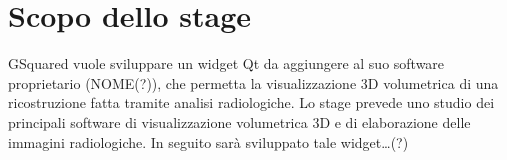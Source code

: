 \section*{Scopo dello stage}
GSquared vuole sviluppare un widget Qt da aggiungere al suo software proprietario (NOME(?)), che permetta la visualizzazione 3D volumetrica di una ricostruzione fatta tramite analisi radiologiche. Lo stage prevede uno studio dei principali software di visualizzazione volumetrica 3D e di elaborazione delle immagini radiologiche. In seguito sarà sviluppato tale widget…(?)

